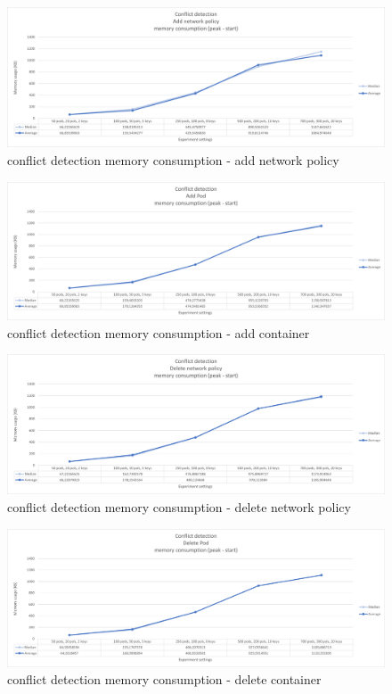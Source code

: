 \begin{figure}[H]
    \centering
    \includegraphics[width=\textwidth]{images/experiment2/addNP-memory-conflict.png}
    \caption{conflict detection memory consumption - add network policy}
    \label{fig:exp2-addNP-memory-conflict}
\end{figure}
\begin{figure}[H]
    \centering
    \includegraphics[width=\textwidth]{images/experiment2/addPod-memory-conflict.png}
    \caption{conflict detection memory consumption - add container}
    \label{fig:exp2-addPod-memory-conflict}
\end{figure}
\begin{figure}[H]
    \centering
    \includegraphics[width=\textwidth]{images/experiment2/delNP-memory-conflict.png}
    \caption{conflict detection memory consumption - delete network policy}
    \label{fig:exp2-delNP-memory-conflict}
\end{figure}
\begin{figure}[H]
    \centering
    \includegraphics[width=\textwidth]{images/experiment2/delPod-memory-conflict.png}
    \caption{conflict detection memory consumption - delete container}
    \label{fig:exp2-delPod-memory-conflict}
\end{figure}


\cleardoublepage
